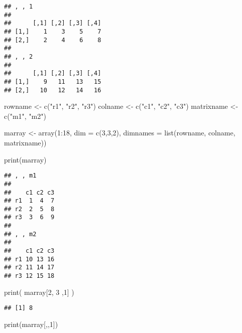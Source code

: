 \documentclass[
]{article}
\newenvironment{Shaded}{\begin{snugshade}}{\end{snugshade}}
\newcommand{\AttributeTok}[1]{\textcolor[rgb]{0.77,0.63,0.00}{#1}}
\newcommand{\DecValTok}[1]{\textcolor[rgb]{0.00,0.00,0.81}{#1}}
\newcommand{\FunctionTok}[1]{\textcolor[rgb]{0.00,0.00,0.00}{#1}}
\newcommand{\NormalTok}[1]{#1}
\newcommand{\OtherTok}[1]{\textcolor[rgb]{0.56,0.35,0.01}{#1}}
\newcommand{\SpecialCharTok}[1]{\textcolor[rgb]{0.00,0.00,0.00}{#1}}
\newcommand{\StringTok}[1]{\textcolor[rgb]{0.31,0.60,0.02}{#1}}
\begin{document}
\begin{verbatim}
## , , 1
## 
##      [,1] [,2] [,3] [,4]
## [1,]    1    3    5    7
## [2,]    2    4    6    8
## 
## , , 2
## 
##      [,1] [,2] [,3] [,4]
## [1,]    9   11   13   15
## [2,]   10   12   14   16
\end{verbatim}

\begin{Shaded}
\begin{Highlighting}[]
\NormalTok{rowname }\OtherTok{\textless{}{-}} \FunctionTok{c}\NormalTok{(}\StringTok{"r1"}\NormalTok{, }\StringTok{"r2"}\NormalTok{, }\StringTok{"r3"}\NormalTok{)}
\NormalTok{colname }\OtherTok{\textless{}{-}} \FunctionTok{c}\NormalTok{(}\StringTok{"c1"}\NormalTok{, }\StringTok{"c2"}\NormalTok{, }\StringTok{"c3"}\NormalTok{)}
\NormalTok{matrixname }\OtherTok{\textless{}{-}} \FunctionTok{c}\NormalTok{(}\StringTok{"m1"}\NormalTok{, }\StringTok{"m2"}\NormalTok{)}

\NormalTok{marray }\OtherTok{\textless{}{-}} \FunctionTok{array}\NormalTok{(}\DecValTok{1}\SpecialCharTok{:}\DecValTok{18}\NormalTok{, }\AttributeTok{dim =} \FunctionTok{c}\NormalTok{(}\DecValTok{3}\NormalTok{,}\DecValTok{3}\NormalTok{,}\DecValTok{2}\NormalTok{),}
                \AttributeTok{dimnames =} \FunctionTok{list}\NormalTok{(rowname, }
\NormalTok{                                colname,}
\NormalTok{                                matrixname))}

\FunctionTok{print}\NormalTok{(marray)}
\end{Highlighting}
\end{Shaded}

\begin{verbatim}
## , , m1
## 
##    c1 c2 c3
## r1  1  4  7
## r2  2  5  8
## r3  3  6  9
## 
## , , m2
## 
##    c1 c2 c3
## r1 10 13 16
## r2 11 14 17
## r3 12 15 18
\end{verbatim}

\begin{Shaded}
\begin{Highlighting}[]
\FunctionTok{print}\NormalTok{( marray[}\DecValTok{2}\NormalTok{, }\DecValTok{3}\NormalTok{ ,}\DecValTok{1}\NormalTok{] )}
\end{Highlighting}
\end{Shaded}

\begin{verbatim}
## [1] 8
\end{verbatim}

\begin{Shaded}
\begin{Highlighting}[]
\FunctionTok{print}\NormalTok{(marray[,,}\DecValTok{1}\NormalTok{])}
\end{Highlighting}
\end{Shaded}
\end{document}
